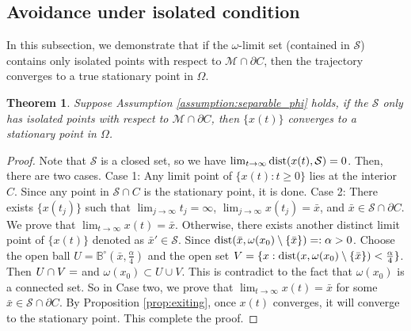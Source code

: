 \documentclass[11pt]{article}
\newcommand{\cM}{\mathcal M}
\newcommand{\cS}{\mathcal S}
\newtheorem{theorem}{Theorem}[section]
\newtheorem{remark}{Remark}[section]
\begin{document}
\subsection{Avoidance under isolated condition}
In this subsection, we demonstrate that if the $\omega$-limit set (contained in $\cS$) contains only isolated points with respect to $\mathcal{M} \cap \partial C$, then the trajectory converges to a true stationary point in $\Omega$.
\begin{theorem}
\label{thm:isolated}
Suppose Assumption \ref{assumption:separable_phi} holds, if the $\cS$ only has isolated points with respect to $\cM\cap\partial C$, 
then $\{x(t)\}$ converges to a stationary point in $\Omega$.   
\end{theorem}
\begin{proof}
Note that $\cS$ is a closed set, so we have $\lim_{t\rightarrow\infty}{\rm dist}(x(t),\cS)=0$. Then, there are two cases. Case 1: Any limit point of $\{x(t):t\geq0\}$ lies at the interior $C$. Since any point in $\cS\cap C$ is the stationary point, it is done. Case 2: There exists $\{x(t_j)\}$ such that $\lim_{j\rightarrow\infty}t_j=\infty$,  $\lim_{j\rightarrow\infty}x(t_j)=\bar x$, and $\bar x\in\cS\cap\partial C$. We prove that $\lim_{t\rightarrow\infty}x(t)=\bar x$. Otherwise, there exists another distinct limit point of $\{x(t)\}$ denoted as $\bar x'\in\cS$. Since ${\rm dist}(\bar x,\omega(x_0)\setminus\{\bar x\})=:\alpha>0$. Choose the open ball $U=\mathbb{B}^\circ(\bar x,\frac{\alpha}{4})$ and the open set $V=\{x:{\rm dist}(x,\omega(x_0)\setminus\{\bar x\})<\frac{\alpha}{4}\}$. Then $U\cap V=\empty$ and $\omega(x_0)\subset U\cup V$. This is contradict to the fact that $\omega(x_0)$ is a connected set. So in Case two, we prove that $\lim_{t\rightarrow\infty}x(t)=\bar x$ for some $\bar x\in\cS\cap\partial C$.  By Proposition \ref{prop:exiting}, once $x(t)$ converges, it will converge to the stationary point. This complete the proof.
\end{proof}

\end{document}
